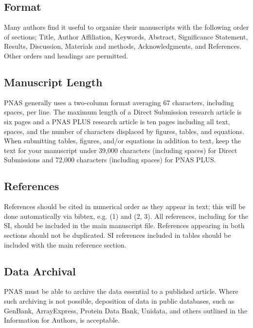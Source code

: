 \documentclass[9pt,twocolumn,twoside,]{pnas-new}
\begin{document}
\subsection*{Format}\label{format}

Many authors find it useful to organize their manuscripts with the
following order of sections; Title, Author Affiliation, Keywords,
Abstract, Significance Statement, Results, Discussion, Materials and
methods, Acknowledgments, and References. Other orders and headings are
permitted.

\subsection*{Manuscript Length}\label{manuscript-length}

PNAS generally uses a two-column format averaging 67 characters,
including spaces, per line. The maximum length of a Direct Submission
research article is six pages and a PNAS PLUS research article is ten
pages including all text, spaces, and the number of characters displaced
by figures, tables, and equations. When submitting tables, figures,
and/or equations in addition to text, keep the text for your manuscript
under 39,000 characters (including spaces) for Direct Submissions and
72,000 characters (including spaces) for PNAS PLUS.

\subsection*{References}\label{references}

References should be cited in numerical order as they appear in text;
this will be done automatically via bibtex, e.g. (1) and (2, 3). All
references, including for the SI, should be included in the main
manuscript file. References appearing in both sections should not be
duplicated. SI references included in tables should be included with the
main reference section.

\subsection*{Data Archival}\label{data-archival}

PNAS must be able to archive the data essential to a published article.
Where such archiving is not possible, deposition of data in public
databases, such as GenBank, ArrayExpress, Protein Data Bank, Unidata,
and others outlined in the Information for Authors, is acceptable.
\end{document}
